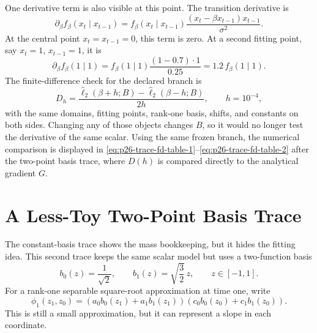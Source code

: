 \documentclass[11pt]{article}
\numberwithin{equation}{section}
\begin{document}
One derivative term is also visible at this point.  The transition derivative
is
\begin{equation}
    \partial_\beta f_\beta(x_t\mid x_{t-1})
    =
    f_\beta(x_t\mid x_{t-1})
    \frac{(x_t-\beta x_{t-1})x_{t-1}}{\sigma^2}.
    \label{eq:p24-trace-df}
\end{equation}
At the central point \(x_t=x_{t-1}=0\), this term is zero.  At a second
fitting point, say \(x_t=1\), \(x_{t-1}=1\), it is
\begin{equation}
    \partial_\beta f_\beta(1\mid1)
    =
    f_\beta(1\mid1)
    \frac{(1-0.7)\cdot1}{0.25}
    =
    1.2\,f_\beta(1\mid1).
    \label{eq:p24-trace-df2}
\end{equation}
The finite-difference check for the declared branch is
\begin{equation}
    D_h
    =
    \frac{\widehat\ell_2(\beta+h;B)-\widehat\ell_2(\beta-h;B)}
         {2h},
    \qquad h=10^{-4},
    \label{eq:p24-trace-fd}
\end{equation}
with the same domains, fitting points, rank-one basis, shifts, and constants
on both sides.  Changing any of those objects changes \(B\), so it would no
longer test the derivative of the same scalar.
Using the same frozen branch, the numerical comparison is displayed in
\eqref{eq:p26-trace-fd-table-1}--\eqref{eq:p26-trace-fd-table-2} after the
two-point basis trace, where \(D(h)\) is compared directly to the analytical
gradient \(G\).

\section{A Less-Toy Two-Point Basis Trace}

The constant-basis trace shows the mass bookkeeping, but it hides the fitting
idea.  This second trace keeps the same scalar model but uses a two-function
basis
\begin{equation}
    b_0(z)=\frac{1}{\sqrt2},
    \qquad
    b_1(z)=\sqrt{\frac32}\,z,
    \qquad z\in[-1,1].
    \label{eq:p25-trace2-1}
\end{equation}
For a rank-one separable square-root approximation at time one, write
\begin{equation}
    \phi_1(z_1,z_0)
    =
    \left(a_0b_0(z_1)+a_1b_1(z_1)\right)
    \left(c_0b_0(z_0)+c_1b_1(z_0)\right).
    \label{eq:p25-trace2-2}
\end{equation}
This is still a small approximation, but it can represent a slope in each
coordinate.
\end{document}
